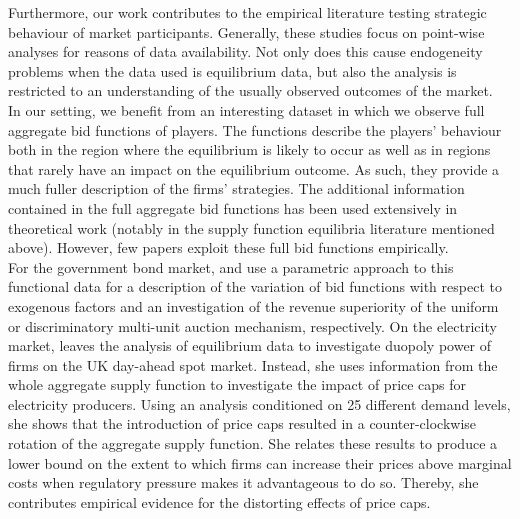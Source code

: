 Furthermore, our work contributes to the empirical literature testing strategic behaviour of market participants. 
 Generally, these studies focus on point-wise analyses for reasons of data availability. Not only does this cause endogeneity problems when the data used is equilibrium data, but also the analysis is restricted to an understanding of the usually observed outcomes of the market. \\
 
In our setting, we benefit from an interesting dataset in which we observe full aggregate bid functions of players. The functions describe the players' behaviour both in the region where the equilibrium is likely to occur as well as in regions that  rarely have an impact on the equilibrium outcome. As such, they provide a much fuller description of the firms' strategies. 
The additional information contained in the full aggregate bid functions has been used extensively in theoretical work (notably in the supply function equilibria literature mentioned above). 
However, few papers exploit these full bid functions empirically. \\
%
%
For the government bond market, \cite{pw2002etude} and \cite{ozcan2004logistic} use a parametric approach to this functional data for a description of the variation of bid functions with respect to exogenous factors and an investigation of the revenue superiority of the uniform or discriminatory multi-unit auction mechanism, respectively. On the electricity market,  \cite{wolfram1999measuring} leaves the analysis of equilibrium data to investigate duopoly power of firms on the UK day-ahead spot market. Instead, she uses information from the whole aggregate supply function to investigate the impact of price caps for electricity producers. Using an analysis conditioned on 25 different demand levels, she shows that the introduction of price caps resulted in a counter-clockwise rotation of the aggregate supply function. She relates these results to produce a lower bound on the extent to which firms can increase their prices above marginal costs when regulatory pressure makes it advantageous to do so. Thereby, she contributes  empirical evidence for the distorting effects of price caps. \\

